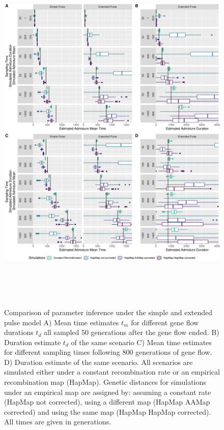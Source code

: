 \documentclass[11pt]{article}
\begin{document}
\begin{figure}
\centering
\includegraphics[width=16cm,height=18cm,keepaspectratio]{Admixture_Time_Inference_Paper_Draft_files/figure-latex/fig4-1.pdf}
\caption{\label{fig:fig4} Comparison of parameter inference under the simple and extended pulse model  A) Mean time estimates $t_m$ for different gene
flow durations $t_d$ all sampled 50 generations after the gene flow ended. B)
Duration estimate $t_d$ of the same scenario C) Mean time estimates for different sampling times following 800
generations of gene flow. D) Duration estimate of the same scenario. All scenarios are simulated either under a constant recombination rate or an empirical recombination map (HapMap). Genetic distances for simulations under an empirical map are assigned by: assuming a constant rate (HapMap not corrected), using a different map (HapMap AAMap corrected) and using the same map (HapMap HapMap corrected). All times are given in generations.}
\end{figure}
\end{document}
